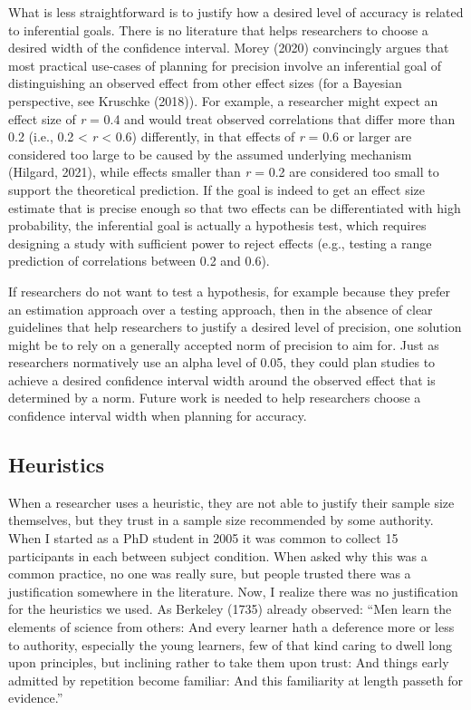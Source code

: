 \documentclass[
  english,
  ,jou, a4paper,floatsintext]{apa6}
\begin{document}
What is less straightforward is to justify how a desired level of accuracy is related to inferential goals. There is no literature that helps researchers to choose a desired width of the confidence interval. Morey (2020) convincingly argues that most practical use-cases of planning for precision involve an inferential goal of distinguishing an observed effect from other effect sizes (for a Bayesian perspective, see Kruschke (2018)). For example, a researcher might expect an effect size of \emph{r} = 0.4 and would treat observed correlations that differ more than 0.2 (i.e., 0.2 \textless{} \emph{r} \textless{} 0.6) differently, in that effects of \emph{r} = 0.6 or larger are considered too large to be caused by the assumed underlying mechanism (Hilgard, 2021), while effects smaller than \emph{r} = 0.2 are considered too small to support the theoretical prediction. If the goal is indeed to get an effect size estimate that is precise enough so that two effects can be differentiated with high probability, the inferential goal is actually a hypothesis test, which requires designing a study with sufficient power to reject effects (e.g., testing a range prediction of correlations between 0.2 and 0.6).

If researchers do not want to test a hypothesis, for example because they prefer an estimation approach over a testing approach, then in the absence of clear guidelines that help researchers to justify a desired level of precision, one solution might be to rely on a generally accepted norm of precision to aim for. Just as researchers normatively use an alpha level of 0.05, they could plan studies to achieve a desired confidence interval width around the observed effect that is determined by a norm. Future work is needed to help researchers choose a confidence interval width when planning for accuracy.

\hypertarget{heuristics}{%
\subsection{Heuristics}\label{heuristics}}

When a researcher uses a heuristic, they are not able to justify their sample size themselves, but they trust in a sample size recommended by some authority. When I started as a PhD student in 2005 it was common to collect 15 participants in each between subject condition. When asked why this was a common practice, no one was really sure, but people trusted there was a justification somewhere in the literature. Now, I realize there was no justification for the heuristics we used. As Berkeley (1735) already observed: ``Men learn the elements of science from others: And every learner hath a deference more or less to authority, especially the young learners, few of that kind caring to dwell long upon principles, but inclining rather to take them upon trust: And things early admitted by repetition become familiar: And this familiarity at length passeth for evidence.''
\end{document}
